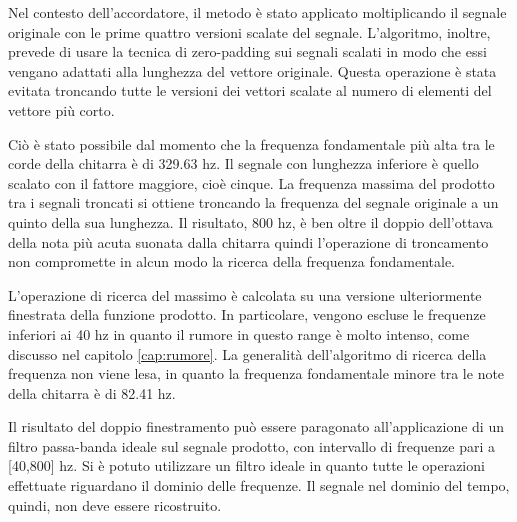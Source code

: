 	Nel contesto dell'accordatore, il metodo è stato applicato moltiplicando il segnale originale con le prime quattro versioni scalate del segnale.
	L'algoritmo, inoltre, prevede di usare la tecnica di zero-padding sui segnali scalati in modo che essi vengano adattati alla lunghezza del vettore originale. 
	Questa operazione è stata evitata troncando tutte le versioni dei vettori scalate al numero di elementi del vettore più corto.

	Ciò è stato possibile dal momento che la frequenza fondamentale più alta tra le corde della chitarra è di 329.63 hz.
	Il segnale con lunghezza inferiore è quello scalato con il fattore maggiore, cioè cinque.
	La frequenza massima del prodotto tra i segnali troncati si ottiene troncando la frequenza del segnale originale a un quinto della sua lunghezza. 
	Il risultato, 800 hz, è ben oltre il doppio dell'ottava della nota più acuta suonata dalla chitarra quindi l'operazione di troncamento non compromette in alcun modo la ricerca della frequenza fondamentale.

	L'operazione di ricerca del massimo è calcolata su una versione ulteriormente finestrata della funzione prodotto. 
	In particolare, vengono escluse le frequenze inferiori ai 40 hz in quanto il rumore in questo range è molto intenso, come discusso nel capitolo \ref{cap:rumore}.
	La generalità dell'algoritmo di ricerca della frequenza non viene lesa, in quanto la frequenza fondamentale minore tra le note della chitarra è di 82.41 hz.

	Il risultato del doppio finestramento può essere paragonato all'applicazione di un filtro passa-banda ideale sul segnale prodotto, con intervallo di frequenze pari a [40,800] hz.
	Si è potuto utilizzare un filtro ideale in quanto tutte le operazioni effettuate riguardano il dominio delle frequenze.
	Il segnale nel dominio del tempo, quindi, non deve essere ricostruito.





